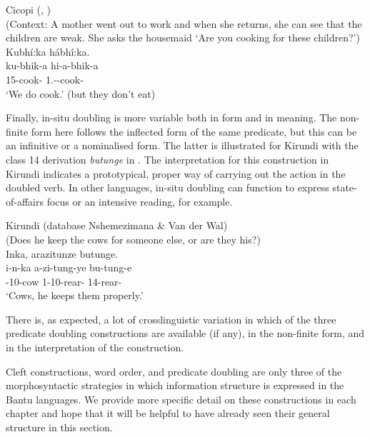 \documentclass[output=paper]{langscibook}
\begin{document}
\ea
\label{ex:cicopi-do-cook}
Cicopi (, \cite{chapters/cicopi})\\
(Context: A mother went out to work and when she returns, she can see that the children are weak. She asks the housemaid ‘Are you cooking for these children?’)\\
Kubhí:ka hábhî:ka.\\
\gll
ku-bhik-a  hi-a-bhik-a\\
15-cook-\FV{}  1\PL.\SM-\DJ{}-cook-\FV{}\\
\glt
‘We do cook.’ (but they don’t eat)\\


\z

Finally, in-situ doubling is more variable both in form and in meaning. The non-finite form here follows the inflected form of the same predicate, but this can be an infinitive or a nominalised form. The latter is illustrated for Kirundi with the class 14 derivation \textit{butunge} in . The interpretation for this construction in Kirundi indicates a prototypical, proper way of carrying out the action in the doubled verb. In other languages, in-situ doubling can function to express state-of-affairs focus or an intensive reading, for example.

\ea
\label{bkm:Ref134546189}
Kirundi (database Nshemezimana \& Van der Wal)\\
(Does he keep the cows for someone else, or are they his?)\\
Inka, arazitunze butunge.\\
\gll
i-n-ka  a-zi-tung-ye  bu-tung-e\\
\AUG{}-10-cow  1\SM{}-10\OM{}-rear-\PFV{}  14-rear-\FV{}\\
\glt
‘Cows, he keeps them properly.’\\


\z

There is, as expected, a lot of crosslinguistic variation in which of the three predicate doubling constructions are available (if any), in the non-finite form, and in the interpretation of the construction.

Cleft constructions, word order, and predicate doubling are only three of the morphosyntactic strategies in which information structure is expressed in the Bantu languages. We provide more specific detail on these constructions in each chapter and hope that it will be helpful to have already seen their general structure in this section.
\end{document}
